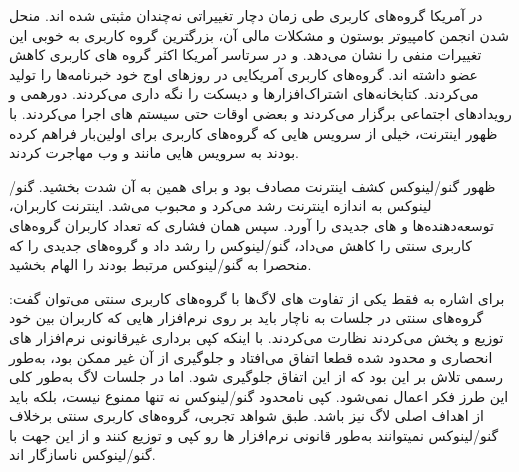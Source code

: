 در آمریکا گروه‌های کاربری طی زمان دچار تغییراتی نه‌چندان مثبتی شده اند.
منحل شدن انجمن کامپیوتر بوستون
و مشکلات مالی آن، بزرگترین گروه کاربری به خوبی این تغییرات منفی را نشان می‌دهد.
و در سرتاسر آمریکا اکثر گروه های کاربری  کاهش عضو داشته اند.
گروه‌های کاربری آمریکایی در روزهای اوج خود خبرنامه‌ها را تولید می‌کردند.
کتابخانه‌های اشتراک‌افزارها و دیسکت را نگه داری می‌کردند.
دورهمی و رویدادهای اجتماعی برگزار می‌کردند و
بعضی اوقات حتی سیستم های
اجرا می‌کردند. با ظهور اینترنت، خیلی از سرویس هایی که گروه‌های کاربری
برای اولین‌بار فراهم کرده بودند به سرویس هایی مانند
و وب مهاجرت کردند.

ظهور گنو/لینوکس کشف اینترنت مصادف بود و برای همین به آن شدت بخشید.
گنو/لینوکس به اندازه اینترنت رشد می‌کرد و محبوب می‌شد.
اینترنت کاربران، توسعه‌دهنده‌ها و  های جدیدی را آورد.
سپس همان فشاری که تعداد کاربران گروه‌های کاربری سنتی را کاهش می‌داد،
گنو/لینوکس را رشد داد و گروه‌های جدیدی را که منحصرا به گنو/لینوکس مرتبط بودند
را الهام بخشید.

برای اشاره به فقط یکی از تفاوت های لاگ‌ها با گروه‌های کاربری سنتی می‌توان گفت:
گروه‌های سنتی در جلسات به ناچار باید بر روی نرم‌افزار هایی که کاربران بین خود
توزیع و پخش می‌کردند نظارت می‌کردند. با اینکه کپی برداری غیرقانونی نرم‌افزار های
انحصاری و محدود شده قطعا اتفاق می‌افتاد و جلوگیری از آن غیر ممکن بود، به‌طور رسمی
تلاش بر این بود که از این اتفاق جلوگیری شود.
اما در جلسات لاگ به‌طور کلی این طرز فکر اعمال نمی‌شود. کپی نامحدود گنو/لینوکس نه تنها ممنوع نیست،
بلکه باید از اهداف اصلی لاگ نیز باشد. طبق شواهد تجربی، گروه‌های کاربری سنتی برخلاف گنو/لینوکس
نمیتوانند به‌طور قانونی نرم‌افزار ها رو کپی و توزیع کنند و از این جهت با گنو/لینوکس ناسازگار اند.

